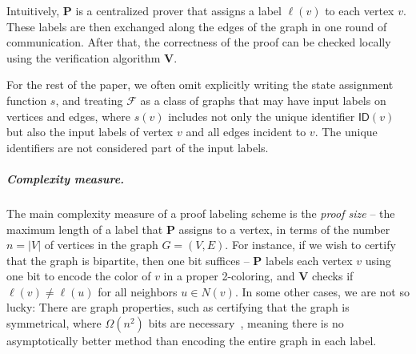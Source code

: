 \documentclass[11pt]{article}
\theoremstyle{definition}
\theoremstyle{remark}
\newcommand{\ID}{\mathsf{ID}}
\begin{document}
Intuitively, $\mathbf{P}$ is a centralized prover that assigns a label $\ell(v)$ to each vertex $v$. These labels are then exchanged along the edges of the graph in one round of communication. After that, the correctness of the proof can be checked locally using the verification algorithm  $\mathbf{V}$.

For the rest of the paper, we often omit explicitly writing the state assignment function $s$, and treating $\mathcal{F}$ as a class of graphs that may have input labels on vertices and edges, where $s(v)$ includes not only the unique identifier $\ID(v)$ but also the input labels of vertex $v$ and all edges incident to $v$. The unique identifiers are not considered part of the input labels.

\subparagraph{Complexity measure.} The main complexity measure of a proof labeling scheme is the \emph{proof size} -- the maximum length of a label that $\mathbf{P}$ assigns to a vertex, in terms of the number $n = |V|$ of vertices in the graph $G=(V,E)$.
 For instance, if we wish to certify that the graph is bipartite, then one bit suffices -- $\mathbf{P}$ labels each vertex $v$ using one bit to encode the color of $v$ in a proper 2-coloring, and $\mathbf{V}$ checks if $\ell(v) \neq \ell(u)$ for all neighbors $u \in N(v)$. In some other cases, we are not so lucky: There are graph properties, such as certifying that the graph is symmetrical, where $\Omega(n^2)$ bits are necessary~\cite{korman03032010,v012a019}, meaning there is no asymptotically better method than encoding the entire graph in each label.
\end{document}
